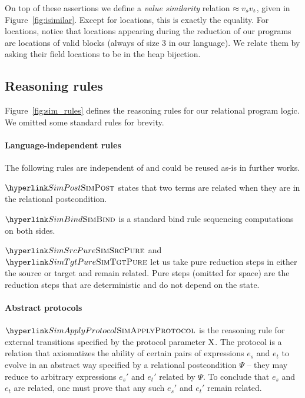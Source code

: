 

On top of these assertions we define a \emph{value similarity} relation $\approx {v_s} {v_t}$, given in Figure~\ref{fig:isimilar}.  Except for locations, this is exactly the equality. For locations, notice that locations appearing during the reduction of our programs are locations of valid blocks (always of size 3 in our language). We relate them by asking their field locations to be in the heap bijection.

\subsection{Reasoning rules}



Figure~\ref{fig:sim_rules} defines the reasoning rules for our relational program logic. We omitted some standard rules for brevity.

\paragraph{Language-independent rules} The following rules are
independent of \LambdaLang and could be reused as-is in further works.

$\RefTirName{SimPost}$ states that two terms are related when they are in the relational postcondition.

$\RefTirName{SimBind}$ is a standard bind rule sequencing computations on both sides.

$\RefTirName{SimSrcPure}$ and $\RefTirName{SimTgtPure}$ let us take pure reduction steps in either the source or target and remain related. Pure steps (omitted for space) are the reduction steps that are deterministic and do not depend on the state.

\paragraph{Abstract protocols}
$\RefTirName{SimApplyProtocol}$ is the reasoning rule for external transitions specified by the protocol parameter $\mathrm{X}$. The protocol is a relation that axiomatizes the ability of certain pairs of expressions $e_s$ and $e_t$ to evolve in an abstract way specified by a relational postcondition $\Psi$ -- they may reduce to arbitrary expressions $e_s'$ and $e_t'$ related by $\Psi$. To conclude that $e_s$ and $e_t$ are related, one must prove that any such $e_s'$ and $e_t'$ remain related.

